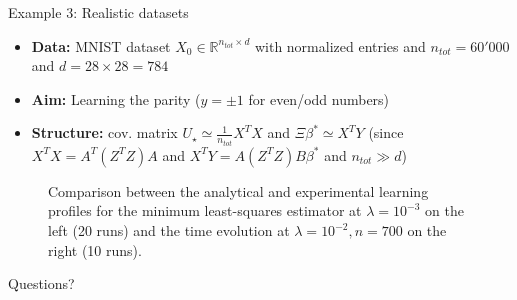 \documentclass[10pt]{beamer}
\begin{document}
\begin{frame}{Example 3: Realistic datasets} 
  \begin{itemize}
    \item \textbf{Data:} MNIST dataset $X_0 \in \mathbb R^{n_{tot} \times d}$ with normalized entries and $n_{tot}=60'000$ and $d=28\times 28 = 784$
    \item \textbf{Aim:} Learning the parity ($y=\pm1$ for even/odd numbers)
    \item \textbf{Structure:} cov. matrix $U_\star \simeq \frac{1}{n_{tot}} X^TX$ and $\Xi \beta^* \simeq X^TY$ (since $X^TX = A^T (Z^T Z) A$ and $X^T Y = A (Z^T Z) B \beta^*$ and $n_{tot} \gg d$)
  \end{itemize}
  \vspace*{-0.7cm}
  \begin{figure}
    \centering
    \caption{\footnotesize 
        Comparison between the analytical and experimental learning profiles for the minimum least-squares estimator at $\lambda = 10^{-3}$ on the left (20 runs) and the time evolution at $\lambda = 10^{-2}, n=700$ on the right (10 runs).
    }
  \end{figure}
\end{frame}



\begin{frame}[standout]
  Questions?
\end{frame}
\end{document}
